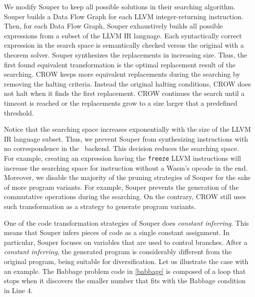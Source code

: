 We modify Souper \cite{Sasnauskas2017Souper:Superoptimizer} to keep all possible solutions in their searching algorithm.
Souper builds a Data Flow Graph for each LLVM integer-returning instruction. 
Then, for each Data Flow Graph, Souper exhaustively builds all possible expressions from a subset of the LLVM IR language.
Each syntactically correct expression in the search space is semantically checked versus the original with a theorem solver. Souper synthesizes the replacements in increasing size. Thus, the first found equivalent transformation is the optimal replacement result of the searching. 
CROW keeps more equivalent replacements during the searching by removing the halting criteria. Instead the original halting conditions, CROW does not halt when it finds the first replacement. CROW continues the search until a timeout is reached or the replacements grow to a size larger that a predefined threshold. 

Notice that the searching space increases exponentially with the size of the LLVM IR language subset. Thus,
we prevent Souper from synthesizing instructions with no correspondence in the \wasm\ backend. This decision reduces the searching space. For example, creating an expression having the  \texttt{freeze} LLVM instructions will increase the searching space for instruction without a Wasm's opcode in the end.
Moreover, we disable the majority of the pruning strategies of Souper for the sake of more program variants.
For example, Souper prevents the generation of the commutative operations during the searching.
On the contrary, CROW still uses such transformation as a strategy to generate program variants. 


One of the code transformation strategies of Souper does \emph{constant inferring}. This means that Souper infers pieces of code as a single constant assignment. In particular, Souper focuses on variables that are used to control branches.
After a \emph{constant inferring}, the generated program is considerably different from the original program, being suitable for diversification.
Let us illustrate the case with an example.
The Babbage problem code in \autoref{babbage} is composed of a loop that stops when it discovers the smaller number that fits with the Babbage condition in Line 4.


